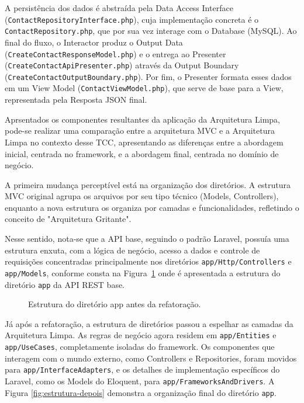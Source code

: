         \par A persistência dos dados é abstraída pela Data Access Interface (\texttt{ContactRepositoryInterface.php}), cuja implementação concreta é o \texttt{ContactRepository.php}, que por sua vez interage com o Database (MySQL). Ao final do fluxo, o Interactor produz o Output Data (\texttt{CreateContactResponseModel.php}) e o entrega ao Presenter (\texttt{CreateContactApiPresenter.php}) através da Output Boundary (\texttt{CreateContactOutputBoundary.php}). Por fim, o Presenter formata esses dados em um View Model (\texttt{ContactViewModel.php}), que serve de base para a View, representada pela Resposta JSON final.

        \par Aprsentados os componentes resultantes da aplicação da Arquitetura Limpa, pode-se realizar uma comparação entre a arquitetura MVC e a Arquitetura Limpa no contexto desse TCC, apresentando as diferenças entre a abordagem inicial, centrada no framework, e a abordagem final, centrada no domínio de negócio. 
        
        \par A primeira mudança perceptível está na organização dos diretórios. A estrutura MVC original agrupa os arquivos por seu tipo técnico (Models, Controllers), enquanto a nova estrutura os organiza por camadas e funcionalidades, refletindo o conceito de "Arquitetura Gritante".
        
        \par Nesse sentido, nota-se que a API base, seguindo o padrão Laravel, possuía uma estrutura enxuta, com a lógica de negócio, acesso a dados e controle de requisições concentradas principalmente nos diretórios \texttt{app/Http/Controllers} e \texttt{app/Models}, conforme consta na Figura~\ref{fig:estrutura-original} onde é apresentada a estrutura do diretório \texttt{app} da API REST base. 

        \begin{figure}[h!]
            \caption{Estrutura do diretório app antes da refatoração.}
            \label{fig:estrutura-original}
        \end{figure}

        \par Já após a refatoração, a estrutura de diretórios passou a espelhar as camadas da Arquitetura Limpa. As regras de negócio agora residem em \texttt{app/Entities} e \texttt{app/UseCases}, completamente isoladas do framework. Os componentes que interagem com o mundo externo, como Controllers e Repositories, foram movidos para \texttt{app/InterfaceAdapters}, e os detalhes de implementação específicos do Laravel, como os Models do Eloquent, para \texttt{app/FrameworksAndDrivers}. A Figura \ref{fig:estrutura-depois} demonstra a organização final do diretório \texttt{app}.

